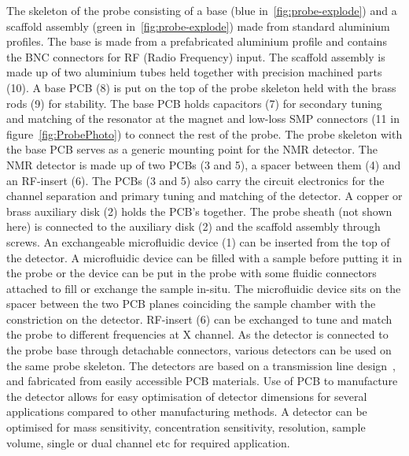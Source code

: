 \documentclass[preprint,12pt]{article}
\begin{document}
The skeleton of the probe consisting of a base (blue in~\ref{fig:probe-explode}) and a scaffold assembly (green in~\ref{fig:probe-explode}) made from standard aluminium profiles. The base is made from a prefabricated aluminium profile and contains the BNC connectors for RF (Radio Frequency) input. The scaffold assembly is made up of two aluminium tubes held together with precision machined parts (10). A base PCB (8) is put on the top of the probe skeleton held with the brass rods (9) for stability. The base PCB holds capacitors (7) for secondary tuning and matching of the resonator at the magnet and low-loss SMP connectors (11 in figure~\ref{fig:ProbePhoto}) to connect the rest of the probe. The probe skeleton with the base PCB serves as a generic mounting point for the NMR detector. The NMR detector is made up of two PCBs (3 and 5), a spacer between them (4) and an RF-insert (6). The PCBs (3 and 5) also carry the circuit electronics for the channel separation and primary tuning and matching of the detector. A copper or brass auxiliary disk (2) holds the PCB's together. The probe sheath (not shown here) is connected to the auxiliary disk (2) and the scaffold assembly through screws. An exchangeable microfluidic device (1) can be inserted from the top of the detector. A microfluidic device can be filled with a sample before putting it in the probe or the device can be put in the probe with some fluidic connectors attached to fill or exchange the sample in-situ. The microfluidic device sits on the spacer between the two PCB planes coinciding the sample chamber with the constriction on the detector.  RF-insert (6) can be exchanged to tune and match the probe to different frequencies at X channel. As the detector is connected to the probe base through detachable connectors, various detectors can be used on the same probe skeleton. The detectors are based on a transmission line design~\cite{gream_2016,stripline_jan}, and fabricated from easily accessible PCB materials. Use of PCB to manufacture the detector allows for easy optimisation of detector dimensions for several applications compared to other manufacturing methods. A detector can be optimised for mass sensitivity, concentration sensitivity, resolution, sample volume, single or dual channel etc for required application.\par
\end{document}
